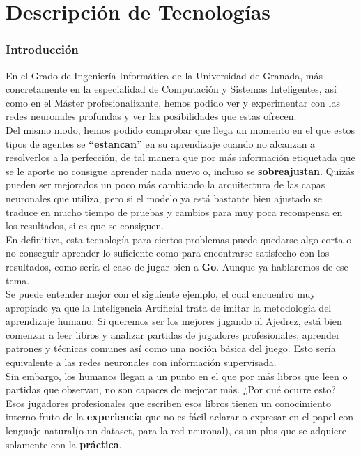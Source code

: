 \documentclass[11pt,fleqn]{book} %
\begin{document}
\part{Descripción de Tecnologías}

\section*{Introducción}

En el Grado de Ingeniería Informática de la Universidad de Granada, más concretamente en la especialidad de Computación y Sistemas Inteligentes, así como en el Máster profesionalizante, hemos podido ver y experimentar con las redes neuronales profundas y ver las posibilidades que estas ofrecen. \\

Del mismo modo, hemos podido comprobar que llega un momento en el que estos tipos de agentes se \textbf{``estancan''} en su aprendizaje cuando no alcanzan a resolverlos a la perfección, de tal manera que por más información etiquetada que se le aporte no consigue aprender nada nuevo o, incluso se \textbf{sobreajustan}. Quizás pueden ser mejorados un poco más cambiando la arquitectura de las capas neuronales que utiliza, pero si el modelo ya está bastante bien ajustado se traduce en mucho tiempo de pruebas y cambios para muy poca recompensa en los resultados, si es que se consiguen. \\

En definitiva, esta tecnología para ciertos problemas puede quedarse algo corta o no conseguir aprender lo suficiente como para encontrarse satisfecho con los resultados, como sería el caso de jugar bien a \textbf{Go}. Aunque ya hablaremos de ese tema.\cite{article:go} \\

Se puede entender mejor con el siguiente ejemplo, el cual encuentro muy apropiado ya que la Inteligencia Artificial trata de imitar la metodología del aprendizaje humano. Si queremos ser los mejores jugando al Ajedrez, está bien comenzar a leer libros y analizar partidas de jugadores profesionales; aprender patrones y técnicas comunes así como una noción básica del juego. Esto sería equivalente a las redes neuronales con información supervisada. \\

Sin embargo, los humanos llegan a un punto en el que por más libros que leen o partidas que observan, no son capaces de mejorar más. ¿Por qué ocurre esto? Esos jugadores profesionales que escriben esos libros tienen un conocimiento interno fruto de la \textbf{experiencia} que no es fácil aclarar o expresar en el papel con lenguaje natural(o un dataset, para la red neuronal), es un plus que se adquiere solamente con la \textbf{práctica}. \\
\end{document}
